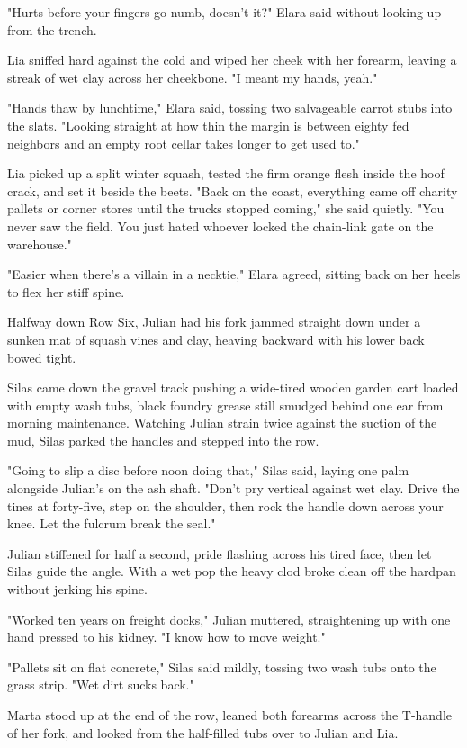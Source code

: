 "Hurts before your fingers go numb, doesn't it?" Elara said without looking up from the trench.

Lia sniffed hard against the cold and wiped her cheek with her forearm, leaving a streak of wet clay across her cheekbone. "I meant my hands, yeah."

"Hands thaw by lunchtime," Elara said, tossing two salvageable carrot stubs into the slats. "Looking straight at how thin the margin is between eighty fed neighbors and an empty root cellar takes longer to get used to."

Lia picked up a split winter squash, tested the firm orange flesh inside the hoof crack, and set it beside the beets. "Back on the coast, everything came off charity pallets or corner stores until the trucks stopped coming," she said quietly. "You never saw the field. You just hated whoever locked the chain-link gate on the warehouse."

"Easier when there's a villain in a necktie," Elara agreed, sitting back on her heels to flex her stiff spine.

Halfway down Row Six, Julian had his fork jammed straight down under a sunken mat of squash vines and clay, heaving backward with his lower back bowed tight.

Silas came down the gravel track pushing a wide-tired wooden garden cart loaded with empty wash tubs, black foundry grease still smudged behind one ear from morning maintenance. Watching Julian strain twice against the suction of the mud, Silas parked the handles and stepped into the row.

"Going to slip a disc before noon doing that," Silas said, laying one palm alongside Julian's on the ash shaft. "Don't pry vertical against wet clay. Drive the tines at forty-five, step on the shoulder, then rock the handle down across your knee. Let the fulcrum break the seal."

Julian stiffened for half a second, pride flashing across his tired face, then let Silas guide the angle. With a wet pop the heavy clod broke clean off the hardpan without jerking his spine.

"Worked ten years on freight docks," Julian muttered, straightening up with one hand pressed to his kidney. "I know how to move weight."

"Pallets sit on flat concrete," Silas said mildly, tossing two wash tubs onto the grass strip. "Wet dirt sucks back."

Marta stood up at the end of the row, leaned both forearms across the T-handle of her fork, and looked from the half-filled tubs over to Julian and Lia.

